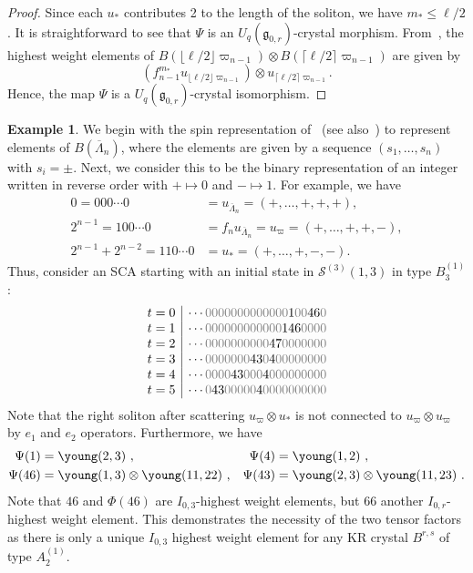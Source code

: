 \documentclass[reqno]{amsart}
\newcommand{\g}{\mathfrak{g}}
\newcommand{\clfw}{\overline{\Lambda}} %
\newcommand{\Sol}{\mathcal{S}} %
\theoremstyle{plain}
\theoremstyle{definition}
\newtheorem{ex}[thm]{Example}
\numberwithin{equation}{section}
\begin{document}
\begin{proof}
Since each $u_*$ contributes 2 to the length of the soliton, we have $m_* \leq \ell / 2$.
It is straightforward to see that $\Psi$ is an $U_q(\g_{0,r})$-crystal morphism.
From~\cite{Stembridge01}, the highest weight elements of $B(\lfloor \ell/2 \rfloor \varpi_{n-1}) \otimes B(\lceil \ell/2 \rceil \varpi_{n-1})$ are given by
\[
(f_{n-1}^{m_*} u_{\lfloor \ell / 2 \rfloor \varpi_{n-1}}) \otimes u_{\lceil \ell / 2 \rceil \varpi_{n-1}}.
\]
Hence, the map $\Psi$ is a $U_q(\g_{0,r})$-crystal isomorphism.
\end{proof}

\begin{ex}
\label{ex:SCA_B_spin}
We begin with the spin representation of~\cite{KN94} (see also~\cite{BS17,HK02}) to represent elements of $B(\clfw_n)$, where the elements are given by a sequence $(s_1, \dotsc, s_n)$ with $s_i = \pm$.
Next, we consider this to be the binary representation of an integer written in reverse order with $+ \mapsto 0$ and $- \mapsto 1$.
For example, we have
\begin{align*} 0 = 000 \dotsm 0 & = u_{\clfw_n} = (+, \dotsc, +, +, +),
\\ 2^{n-1} = 100 \dotsm 0 & = f_n u_{\clfw_n} = u_{\varpi} = (+, \dotsc, +, +, -),
\\ 2^{n-1} + 2^{n-2} = 110 \dotsm 0 & = u_* = (+, \dotsc, +, -, -).
\end{align*}
Thus, consider an SCA starting with an initial state in $\Sol^{(3)}(1,3)$ in type $B_3^{(1)}$:
\[
\begin{array}{c|c}
t = 0 & \cdots {\color{gray} 0000000000000} 1 {\color{gray} 00} 46 {\color{gray} 0} \\
t = 1 & \cdots {\color{gray} 000000000000} 146 {\color{gray} 0000} \\
t = 2 & \cdots {\color{gray} 0000000000} 47 {\color{gray} 0000000} \\
t = 3 & \cdots {\color{gray} 0000000} 43 {\color{gray} 0} 4 {\color{gray} 00000000} \\
t = 4 & \cdots {\color{gray} 0000} 43 {\color{gray} 000} 4{\color{gray} 000000000} \\
t = 5 & \cdots {\color{gray} 0} 43 {\color{gray} 00000} 4{\color{gray} 0000000000}
\end{array}
\]
Note that the right soliton after scattering $u_{\varpi} \otimes u_*$ is not connected to $u_{\varpi} \otimes u_{\varpi}$ by $e_1$ and $e_2$ operators.
Furthermore, we have
\begin{align*}
\Psi(1) & = \young(2,3)\ ,
&
\Psi(4) & = \young(1,2)\ ,
\\
\Psi(46) & = \young(1,3) \otimes \young(11,22)\ ,
& 
\Psi(43) & = \young(2,3) \otimes \young(11,23)\ .
\end{align*}
Note that $46$ and $\Phi(46)$ are $I_{0,3}$-highest weight elements, but $66$ another $I_{0,r}$-highest weight element. This demonstrates the necessity of the two tensor factors as there is only a unique $I_{0,3}$ highest weight element for any KR crystal $B^{r,s}$ of type $A_2^{(1)}$.
\end{ex}
\end{document}
